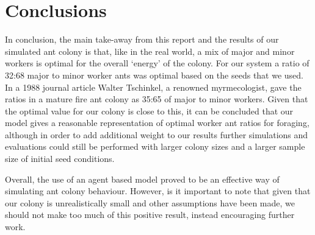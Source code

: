  \section{Conclusions}
In conclusion, the main take-away from this report and the results of our simulated ant colony is that, like in the real world, a mix of major and minor workers is optimal for the overall `energy' of the colony. For our system a ratio of 32:68 major to minor worker ants was optimal based on the seeds that we used. In a 1988 journal article \cite{Tschinkel1988} Walter Tschinkel, a renowned myrmecologist, gave the ratios in a mature fire ant colony as 35:65 of major to minor workers. Given that the optimal value for our colony is close to this, it can be concluded that our model gives a reasonable representation of optimal worker ant ratios for foraging, although in order to add additional weight to our results further simulations and evaluations could still be performed with larger colony sizes and a larger sample size of initial seed conditions.

Overall, the use of an agent based model proved to be an effective way of simulating ant colony behaviour. However, is it important to note that given that our colony is unrealistically small and other assumptions have been made, we should not make too much of this positive result, instead encouraging further work.
